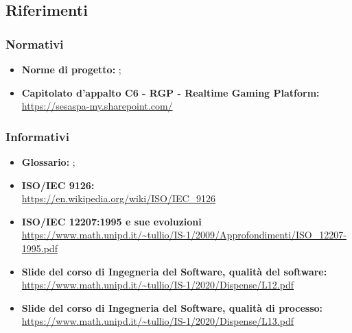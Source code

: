 	\subsection{Riferimenti}
		\subsubsection{Normativi}
		\begin{itemize}
			\item \textbf{Norme di progetto:} ;
			\item \textbf{Capitolato d’appalto C6 - RGP - Realtime Gaming Platform:}\\
			\href{https://sesaspa-my.sharepoint.com/personal/s_dindo_vargroup_it/_layouts/15/onedrive.aspx?id=\%2Fpersonal\%2Fs\%5Fdindo\%5Fvargroup\%5Fit\%2FDocuments\%2FDownload\%2Fupload\%2FIngegneria\%5Fsoftware\%2FCapitolato\%5FIngegneria\%5Fsoftware\%2Epdf\&parent=\%2Fpersonal\%2Fs\%5Fdindo\%5Fvargroup\%5Fit\%2FDocuments\%2FDownload\%2Fupload\%2FIngegneria\%5Fsoftware\&originalPath=aHR0cHM6Ly9zZXNhc3BhLW15LnNoYXJlcG9pbnQuY29tLzpiOi9nL3BlcnNvbmFsL3NfZGluZG9fdmFyZ3JvdXBfaXQvRVRodmF5MGY2S1ZDb1h5ZFlPY2UybGtCdC1NWWNuVzF5YWZSWEZYVklPSXNIZz9ydGltZT1jQjNzY3NxczJFZw}{https://sesaspa-my.sharepoint.com/}
		\end{itemize}
		\subsubsection{Informativi}
		\begin{itemize}
			\item \textbf{Glossario:} ;
			\item \textbf{ISO/IEC 9126:}\\
			\url{https://en.wikipedia.org/wiki/ISO/IEC_9126}
			
			\item \textbf{ISO/IEC 12207:1995 e sue evoluzioni}\\
			\url{https://www.math.unipd.it/~tullio/IS-1/2009/Approfondimenti/ISO_12207-1995.pdf}
			
			\item \textbf{Slide del corso di Ingegneria del Software, qualità del software:}\\
			\url{https://www.math.unipd.it/~tullio/IS-1/2020/Dispense/L12.pdf}
			
			\item \textbf{Slide del corso di Ingegneria del Software, qualità di processo:}\\
			\url{https://www.math.unipd.it/~tullio/IS-1/2020/Dispense/L13.pdf}
		
		\end{itemize}
	